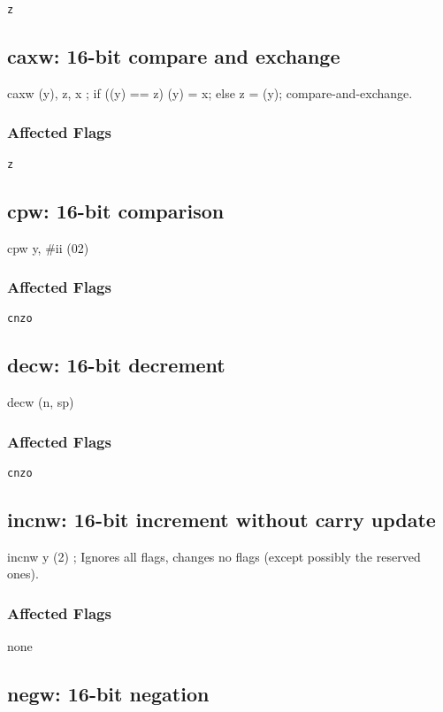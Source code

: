 \documentclass{book}
\begin{document}
\texttt{z}


\subsection{caxw: 16-bit compare and exchange}

caxw (y), z, x ; if ((y) == z) (y) = x; else z = (y); compare-and-exchange.

\subsubsection*{Affected Flags}

\texttt{z}


\subsection{cpw: 16-bit comparison}

cpw y, \#ii (02)

\subsubsection*{Affected Flags}

\texttt{cnzo}


\subsection{decw: 16-bit decrement}

decw (n, sp)

\subsubsection*{Affected Flags}

\texttt{cnzo}


\subsection{incnw: 16-bit increment without carry update}

incnw y (2)            ; Ignores all flags, changes no flags (except possibly the reserved ones).

\subsubsection*{Affected Flags}

none


\subsection{negw: 16-bit negation}
\end{document}
